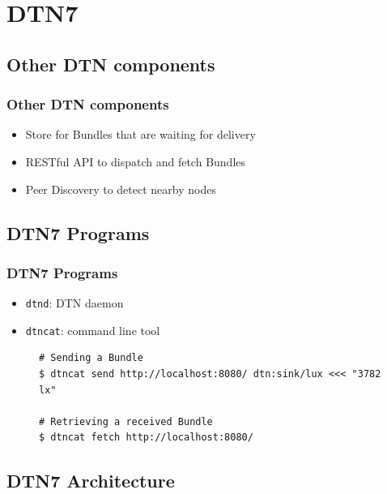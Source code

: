 \section{DTN7}

\subsection{Other \acs{DTN} components}

\begin{frame}
  \frametitle{Other \acs{DTN} components}

  \begin{itemize}
  \item Store for Bundles that are waiting for delivery
  \item RESTful API to dispatch and fetch Bundles
  \item Peer Discovery to detect nearby nodes
  \end{itemize}
\end{frame}

\subsection{DTN7 Programs}

\begin{frame}[fragile]
  \frametitle{DTN7 Programs}

  \begin{itemize}
  \item \texttt{dtnd}: \acs{DTN} daemon
  \item \texttt{dtncat}: command line tool
  \end{itemize}

  \begin{figure}

    \begin{lstlisting}
# Sending a Bundle
$ dtncat send http://localhost:8080/ dtn:sink/lux <<< "3782 lx"

# Retrieving a received Bundle
$ dtncat fetch http://localhost:8080/
    \end{lstlisting}
  \end{figure}
\end{frame}

\subsection{DTN7 Architecture}


